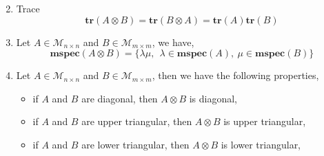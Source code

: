 \begin{proposition}
\begin{enumerate}[label=(\alph*).]
\begin{equation}
      \end{equation}
    \item Trace      
      \begin{equation}
      \mathbf{tr} ( A \otimes B ) = \mathbf{tr} ( B \otimes A ) =  \mathbf{tr} ( A ) \mathbf{tr} ( B )
      \end{equation}
    \item       
      Let $A \in \mathcal{M}_{n \times n}$ and $B \in \mathcal{M}_{m \times m}$, we have,
      \begin{equation}
      \label{kronecker_prod_spec}
      \mathbf{mspec} ( A \otimes B ) = \{ \lambda \mu,~~\lambda \in \mathbf{mspec}(A),~\mu \in \mathbf{mspec}(B) \}
      \end{equation}
    \item  
      Let $A \in \mathcal{M}_{n \times n}$ and $B \in \mathcal{M}_{m \times m}$, then we have the following properties,
      \begin{itemize}
      \item if $A$ and $B$ are diagonal, then $A\otimes B$ is diagonal,
      \item if $A$ and $B$ are upper triangular, then $A\otimes B$ is upper triangular,
      \item if $A$ and $B$ are lower triangular, then $A\otimes B$ is lower triangular,
      \end{itemize}
  \end{enumerate}
\end{proposition}




